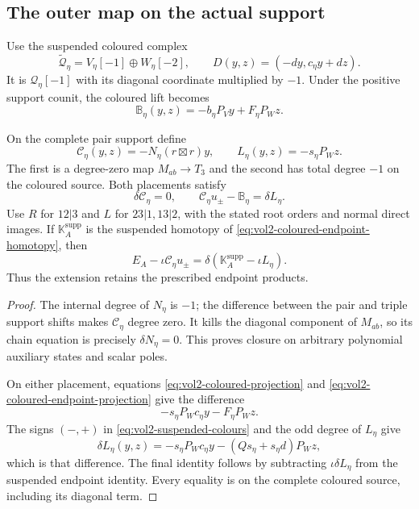 \subsection{The outer map on the actual support}

Use the suspended coloured complex
\begin{equation}\label{eq:vol2-suspended-colours}
 \widetilde{\mathcal Q}_\eta
   =V_\eta[-1]\oplus W_\eta[-2],\qquad
 D(y,z)=(-dy,c_\eta y+dz).
\end{equation}
It is $\mathcal Q_\eta[-1]$ with its diagonal coordinate
multiplied by $-1$. Under the positive support counit, the
coloured lift becomes
\[
 \mathbb B_\eta(y,z)=-b_\eta P_Vy+F_\eta P_Wz.
\]

\begin{theorem}
\label{thm:vol2-supported-outer-extension}
On the complete pair support define
\begin{equation}\label{eq:vol2-supported-outer-map}
 \mathcal C_\eta(y,z)=-N_\eta(r\boxtimes r)y,
 \qquad L_\eta(y,z)=-s_\eta P_Wz.
\end{equation}
The first is a degree-zero map $M_{ab}\to T_3$ and the second
has total degree $-1$ on the coloured source. Both placements
satisfy
\begin{equation}\label{eq:vol2-supported-placement-equation}
 \delta\mathcal C_\eta=0,
 \qquad \mathcal C_\eta u_\pm-\mathbb B_\eta=\delta L_\eta.
\end{equation}
Use $R$ for $12|3$ and $L$ for $23|1,13|2$, with the stated
root orders and normal direct images. If
$\mathbb K_A^{\mathrm{supp}}$ is the suspended homotopy of
\eqref{eq:vol2-coloured-endpoint-homotopy}, then
\[
 E_A-\iota\mathcal C_\eta u_\pm
 =\delta(\mathbb K_A^{\mathrm{supp}}-\iota L_\eta).
\]
Thus the extension retains the prescribed endpoint products.
\end{theorem}

\begin{proof}
The internal degree of $N_\eta$ is $-1$; the difference
between the pair and triple support shifts makes
$\mathcal C_\eta$ degree zero. It kills the diagonal component
of $M_{ab}$, so its chain equation is precisely
$\delta N_\eta=0$. This proves closure on arbitrary
polynomial auxiliary states and scalar poles.

On either placement, equations
\eqref{eq:vol2-coloured-projection} and
\eqref{eq:vol2-coloured-endpoint-projection} give the difference
\[
 -s_\eta P_Wc_\eta y-F_\eta P_Wz.
\]
The signs $(-,+)$ in
\eqref{eq:vol2-suspended-colours} and the odd degree of
$L_\eta$ give
\[
 \delta L_\eta(y,z)
 =-s_\eta P_Wc_\eta y-(Qs_\eta+s_\eta d)P_Wz,
\]
which is that difference. The final identity follows by
subtracting $\iota\delta L_\eta$ from the suspended endpoint
identity. Every equality is on the complete coloured source,
including its diagonal term.
\end{proof}

